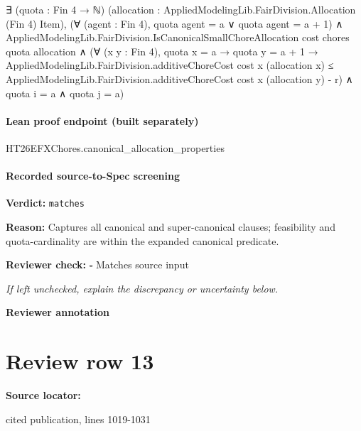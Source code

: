 \documentclass[10pt]{article}
\newcommand{\reviewerbox}{%
  \par\noindent\fbox{\parbox{0.96\linewidth}{\rule{0pt}{0.38in}}}\par
}
\newcommand{\reviewmatch}[1]{%
  \par\noindent\textbf{Reviewer check:} $\square$\; #1\par
  \noindent\emph{If left unchecked, explain the discrepancy or uncertainty below.}\par
}
\begin{document}
\begin{ReviewVerbatim}
                                    ∃ (quota : Fin 4 → ℕ) (allocation :
                                      AppliedModelingLib.FairDivision.Allocation (Fin 4) Item),
                                      (∀ (agent : Fin 4), quota agent = a ∨ quota agent = a + 1) ∧
                                        AppliedModelingLib.FairDivision.IsCanonicalSmallChoreAllocation cost chores
                                            quota allocation ∧
                                          (∀ (x y : Fin 4),
                                              quota x = a →
                                                quota y = a + 1 →
                                                  AppliedModelingLib.FairDivision.additiveChoreCost cost x
                                                      (allocation x) ≤
                                                    AppliedModelingLib.FairDivision.additiveChoreCost cost x
                                                        (allocation y) -
                                                      r) ∧
                                            quota i = a ∧ quota j = a)
\end{ReviewVerbatim}



\paragraph{Lean proof endpoint (built separately)}\begin{ReviewVerbatim}
HT26EFXChores.canonical_allocation_properties
\end{ReviewVerbatim}

\paragraph{Recorded source-to-Spec screening}
\textbf{Verdict:} \texttt{matches}
\\
{\raggedright
\textbf{Reason:} Captures all canonical and super-\allowbreak{}canonical clauses;\allowbreak{} feasibility and quota-\allowbreak{}cardinality are within the expanded canonical predicate.\allowbreak{}
\par}
\reviewmatch{Matches source input}
\noindent\textbf{Reviewer annotation}\par
\reviewerbox
\clearpage
\hypertarget{source-claim-0869bc0832b92b55}{}
\section*{Review row 13}
\textbf{Source locator:} {\footnotesize\raggedright cited publication, lines 1019-\allowbreak{}1031\par}
\end{document}

